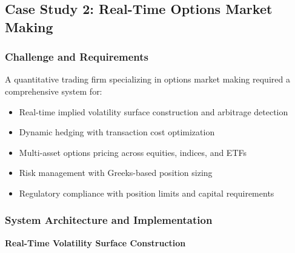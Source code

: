 \documentclass[12pt,a4paper]{article}
\theoremstyle{definition}
\theoremstyle{remark}
\begin{document}
\subsection{Case Study 2: Real-Time Options Market Making}

\subsubsection{Challenge and Requirements}

A quantitative trading firm specializing in options market making required a comprehensive system for:

\begin{itemize}
    \item Real-time implied volatility surface construction and arbitrage detection
    \item Dynamic hedging with transaction cost optimization
    \item Multi-asset options pricing across equities, indices, and ETFs
    \item Risk management with Greeks-based position sizing
    \item Regulatory compliance with position limits and capital requirements
\end{itemize}

\subsubsection{System Architecture and Implementation}

\textbf{Real-Time Volatility Surface Construction}
\end{document}
